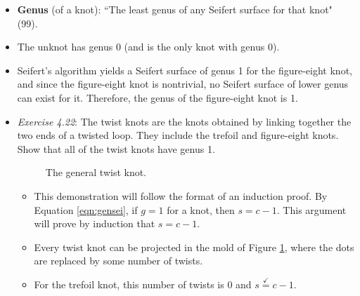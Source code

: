 \documentclass[titlepage]{article}
\numberwithin{figure}{section}
\numberwithin{table}{section}
\numberwithin{equation}{section}
\newcommand{\dq}[2]{``#1" (#2).}
\begin{document}
\begin{itemize}
    \item \textbf{Genus} (of a knot): \dq{The least genus of any Seifert surface for that knot}{99}
    \item The unknot has genus 0 (and is the only knot with genus 0).
    \item Seifert's algorithm yields a Seifert surface of genus 1 for the figure-eight knot, and since the figure-eight knot is nontrivial, no Seifert surface of lower genus can exist for it. Therefore, the genus of the figure-eight knot is 1.
    \item \emph{Exercise 4.22}: The twist knots are the knots obtained by linking together the two ends of a twisted loop. They include the trefoil and figure-eight knots. Show that all of the twist knots have genus 1.
    \begin{figure}[h!]
        \centering
        \caption{The general twist knot.}
        \label{fig:twistknots}
    \end{figure}
    \begin{itemize}
        \item This demonstration will follow the format of an induction proof. By Equation \ref{eqn:gensei}, if $g=1$ for a knot, then $s=c-1$. This argument will prove by induction that $s=c-1$.
        \item Every twist knot can be projected in the mold of Figure \ref{fig:twistknots}, where the dots are replaced by some number of twists.
        \item For the trefoil knot, this number of twists is 0 and $s\overset{\checkmark}{=}c-1$.

\end{itemize}
\end{itemize}
\end{document}
